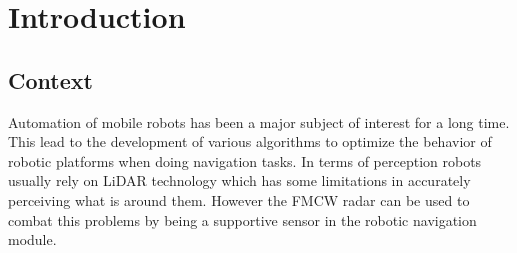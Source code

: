 \chapter{Introduction} \label{ch:introduction}





\section{Context}
Automation of mobile robots has been a major subject of interest for a long time. This lead to the development of various algorithms to optimize the behavior of robotic platforms when doing navigation tasks. In terms of perception robots usually rely on \ac{LiDAR} technology which has some limitations in accurately perceiving what is around them. However the \ac{FMCW} \ac{radar} can be used to combat this problems by being a supportive sensor in the robotic navigation module.

